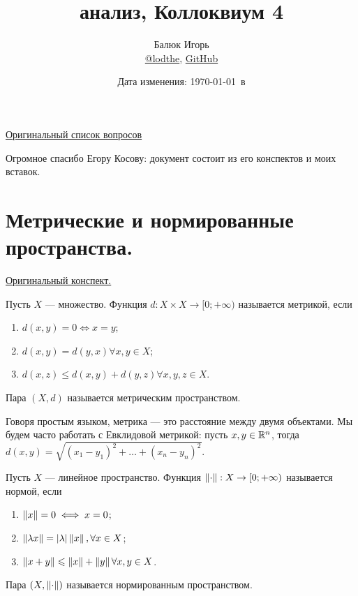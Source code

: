 \documentclass[a4paper]{article}
\title{\HugeМатематический анализ, Коллоквиум 4}
\author{
	Балюк Игорь \\
	\href{https://teleg.run/lodthe}{@lodthe},
    \href{https://github.com/LoDThe/hse-tex}{GitHub} \\
}
\date{Дата изменения: \today \ в \currenttime}
\theoremstyle{named}
\begin{document}
    \maketitle

    \tableofcontents

    \newpage

    \href{https://www.youtube.com/watch?v=dQw4w9WgXcQ}{Оригинальный список вопросов}

    Огромное спасибо Егору Косову: документ состоит из его конспектов и моих вставок.

    \section{Метрические и нормированные пространства.}

        \href{https://www.dropbox.com/s/donysz87em9jfhs/%D0%9B%D0%B5%D0%BA%D1%86%D0%B8%D1%8F%208.pdf?dl=0}{Оригинальный конспект.}

        \begin{definition*}
            Пусть $X$ --- множество. Функция $d: X \times X \to [0; +\infty)$ называется метрикой, если
            \begin{enumerate}
            \item $d(x, y) = 0 \iff x = y$;
            \item $d(x, y) = d(y, x) \forall x, y \in X$;
            \item $d(x, z) \leq d(x, y) + d(y, z) \forall x, y, z \in X$.
            \end{enumerate}

            Пара $(X, d)$ называется метрическим пространством.
        \end{definition*}

        Говоря простым языком, метрика --- это расстояние между двумя объектами. Мы будем часто работать с Евклидовой метрикой: пусть $x, y \in \mathbb{R}^n$, тогда $d(x, y) = \sqrt{(x_1 - y_1)^2 + \dots + (x_n - y_n)^2}$.

        \begin{definition*}
            Пусть $X$ --- линейное пространство. Функция $\left\lVert\cdot\right\rVert: X \to [0; +\infty)$ называется нормой, если
            \begin{enumerate}
            \item $\left\lVert x\right\rVert = 0 \iff x = 0$;
            \item $\left\lVert\lambda x\right\rVert = |\lambda| \left\lVert x\right\rVert, \forall x \in X$;
            \item $\left\lVert x + y\right\rVert \leqslant \left\lVert x\right\rVert + \left\lVert y\right\rVert \forall x, y \in X$.
            \end{enumerate}

            Пара $(X, \left\lVert\cdot\right\rVert)$ называется нормированным пространством.
        \end{definition*}
\end{document}
